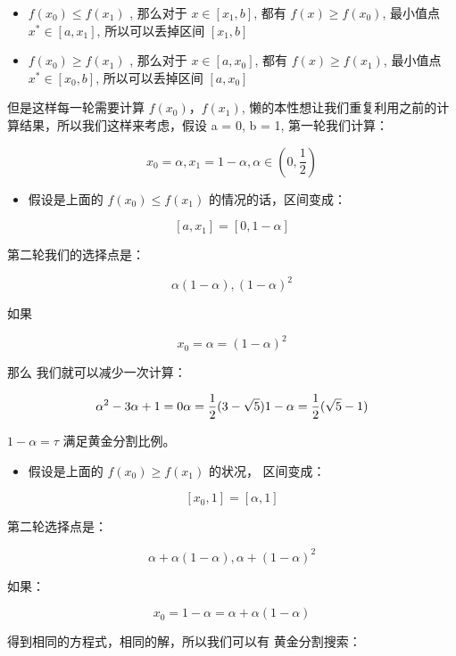 \documentclass[
]{book}
\providecommand{\tightlist}{%
  \setlength{\itemsep}{0pt}\setlength{\parskip}{0pt}}
\begin{document}
\begin{itemize}
\tightlist
\item
  \(f(x_0) \le f(x_1)\) , 那么对于 \(x \in [x_1, b]\), 都有 \(f(x) \ge f(x_0)\), 最小值点 \(x^* \in [a, x_1]\), 所以可以丢掉区间 \([x_1, b]\)
\item
  \(f(x_0) \ge f(x_1)\) , 那么对于 \(x \in [a, x_0]\), 都有 \(f(x) \ge f(x_1)\), 最小值点 \(x^* \in [x_0, b]\), 所以可以丢掉区间 \([a, x_0]\)
\end{itemize}

但是这样每一轮需要计算 \(f(x_0)， f(x_1)\), 懒的本性想让我们重复利用之前的计算结果，所以我们这样来考虑，假设 a = 0, b = 1, 第一轮我们计算：

\[x_0 = \alpha, x_1 = 1 - \alpha, \alpha \in (0, \frac{1}{2})\]

\begin{itemize}
\tightlist
\item
  假设是上面的 \(f(x_0) \le f(x_1)\) 的情况的话，区间变成：
\end{itemize}

\[[a, x_1] = [0, 1- \alpha]\]

第二轮我们的选择点是：

\[\alpha(1- \alpha), (1 - \alpha)^2\]

如果

\[x_0 = \alpha = (1 - \alpha)^2 \]

那么 我们就可以减少一次计算：

\[\alpha^2 - 3 \alpha + 1 = 0 \\
\alpha = \frac{1}{2}(3 - \sqrt{5}) \\
1 - \alpha = \frac{1}{2}(\sqrt{5} - 1) \]

\(1 - \alpha = \tau\) 满足黄金分割比例。

\begin{itemize}
\tightlist
\item
  假设是上面的 \(f(x_0) \ge f(x_1)\) 的状况， 区间变成：
\end{itemize}

\[
[x_0, 1] = [\alpha, 1]
\]

第二轮选择点是：

\[\alpha + \alpha(1- \alpha), \alpha + (1 - \alpha)^2\]

如果：

\[x_0 = 1 - \alpha = \alpha + \alpha(1 - \alpha) \]

得到相同的方程式，相同的解，所以我们可以有 黄金分割搜索：
\end{document}
